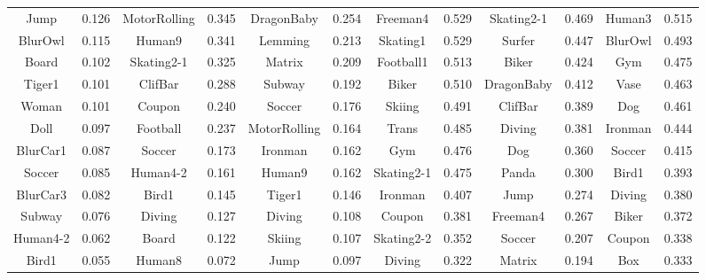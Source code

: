 \documentclass{article}
\begin{document}
\begin{table} [htbp]
{\begin{tabular}{cccccccccccc}
\textcolor[rgb]{1,0,0}{Jump}&0.126&MotorRolling&0.345&DragonBaby&0.254&Freeman4&0.529&Skating2-1&0.469&Human3&0.515\\
BlurOwl&0.115&Human9&0.341&Lemming&0.213&Skating1&0.529&Surfer&0.447&BlurOwl&0.493\\
Board&0.102&Skating2-1&0.325&Matrix&0.209&Football1&0.513&Biker&0.424&Gym&0.475\\
Tiger1&0.101&ClifBar&0.288&Subway&0.192&Biker&0.510&DragonBaby&0.412&Vase&0.463\\
Woman&0.101&Coupon&0.240&Soccer&0.176&Skiing&0.491&ClifBar&0.389&Dog&0.461\\
Doll&0.097&Football&0.237&MotorRolling&0.164&Trans&0.485&\textcolor[rgb]{0,1,0}{Diving}&0.381&Ironman&0.444\\
BlurCar1&0.087&Soccer&0.173&Ironman&0.162&Gym&0.476&Dog&0.360&Soccer&0.415\\
Soccer&0.085&Human4-2&0.161&Human9&0.162&Skating2-1&0.475&Panda&0.300&Bird1&0.393\\
BlurCar3&0.082&Bird1&0.145&Tiger1&0.146&Ironman&0.407&\textcolor[rgb]{1,0,0}{Jump}&0.274&\textcolor[rgb]{0,1,0}{Diving}&0.380\\
Subway&0.076&\textcolor[rgb]{0,1,0}{Diving}&0.127&\textcolor[rgb]{0,1,0}{Diving}&0.108&Coupon&0.381&Freeman4&0.267&Biker&0.372\\
Human4-2&0.062&Board&0.122&Skiing&0.107&Skating2-2&0.352&Soccer&0.207&Coupon&0.338\\
Bird1&0.055&Human8&0.072&\textcolor[rgb]{1,0,0}{Jump}&0.097&\textcolor[rgb]{0,1,0}{Diving}&0.322&Matrix&0.194&Box&0.333\\

\end{tabular}}
\end{table}
\end{document}

